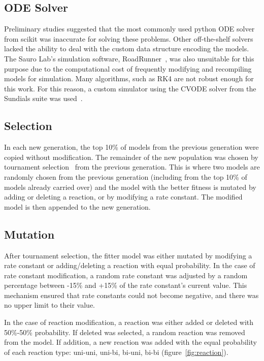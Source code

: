 \documentclass[12pt]{report}
\begin{document}
\subsection{ODE Solver}
Preliminary studies suggested that the most commonly used python ODE solver from scikit was inaccurate for solving these problems. Other off-the-shelf solvers lacked the ability to deal with the custom data structure encoding the models. The Sauro Lab's simulation software, RoadRunner~\cite{Somogyi2015}, was also unsuitable for this purpose due to the computational cost of frequently modifying and recompiling models for simulation. Many algorithms, such as RK4 are not robust enough for this work. For this reason, a custom simulator using the CVODE solver from the Sundials suite was used~\cite{hindmarsh2005sundials}. 

\subsection{Selection}
In each new generation, the top 10\% of models from the previous generation were copied without modification. The remainder of the new population was chosen by tournament selection~\cite{Miller1995} from the previous generation. This is where two models are randomly chosen from the previous generation (including from the top 10\% of models already carried over) and the model with the better fitness is mutated by adding or deleting a reaction, or by modifying a rate constant. The modified model is then appended to the new generation. 

\subsection{Mutation}
After tournament selection, the fitter model was either mutated by modifying a rate constant or adding/deleting a reaction with equal probability. In the case of rate constant modification, a random rate constant was adjusted by a random percentage between -15\% and +15\% of the rate constant's current value. This mechanism ensured that rate constants could not become negative, and there was no upper limit to their value. 

In the case of reaction modification, a reaction was either added or deleted with 50\%-50\% probability. If deleted was selected, a random reaction was removed from the model. If addition, a new reaction was added with the equal probability of each reaction type: uni-uni, uni-bi, bi-uni, bi-bi (figure~\ref{fig:reaction}). 
\end{document}
